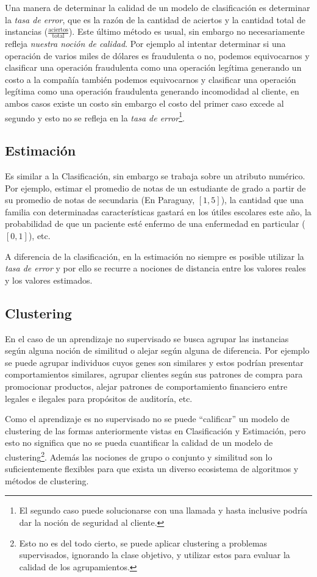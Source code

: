 \documentclass[10pt,a4paper]{article}
\begin{document}
Una manera de determinar la calidad de un modelo de clasificación es determinar la \textit{tasa de error}, que es la razón de la cantidad de aciertos y la cantidad total de instancias ($\frac{\text{aciertos}}{\text{total}}$). Este último método es usual, sin embargo no necesariamente refleja \textit{nuestra noción de calidad}. Por ejemplo al intentar determinar si una operación de varios miles de dólares es fraudulenta o no, podemos equivocarnos y clasificar una operación fraudulenta como una operación legítima generando un costo a la compañía también podemos equivocarnos y clasificar una operación legítima como una operación fraudulenta generando incomodidad al cliente, en ambos casos existe un costo sin embargo el costo del primer caso excede al segundo y esto no se refleja en la \textit{tasa de error}\footnote{El segundo caso puede solucionarse con una llamada y hasta inclusive podría dar la noción de seguridad al cliente.}.
\subsection{Estimación}
Es similar a la Clasificación, sin embargo se trabaja sobre un atributo numérico. Por ejemplo, estimar el promedio de notas de un estudiante de grado a partir de su promedio de notas de secundaria (En Paraguay, $[1, 5]$), la cantidad que una familia con determinadas características gastará en los útiles escolares este año, la probabilidad de que un paciente esté enfermo de una enfermedad en particular ($[0, 1]$), etc.

A diferencia de la clasificación, en la estimación no siempre es posible utilizar la \textit{tasa de error} y por ello se recurre a nociones de distancia entre los valores reales y los valores estimados.

\subsection{Clustering}
En el caso de un aprendizaje no supervisado se busca agrupar las instancias según alguna noción de similitud o alejar según alguna de diferencia. Por ejemplo se puede agrupar individuos cuyos genes son similares y estos podrían presentar comportamientos similares, agrupar clientes según sus patrones de compra para promocionar productos, alejar patrones de comportamiento financiero entre legales e ilegales para propósitos de auditoría, etc.

Como el aprendizaje es no supervisado no se puede ``calificar'' un modelo de clustering de las formas anteriormente vistas en Clasificación y Estimación, pero esto no significa que no se pueda cuantificar la calidad de un modelo de clustering\footnote{Esto no es del todo cierto, se puede aplicar clustering a problemas supervisados, ignorando la clase objetivo, y utilizar estos para evaluar la calidad de los agrupamientos.}. Además las nociones de grupo o conjunto y similitud son lo suficientemente flexibles para que exista un diverso ecosistema de algoritmos y métodos de clustering.
\end{document}
